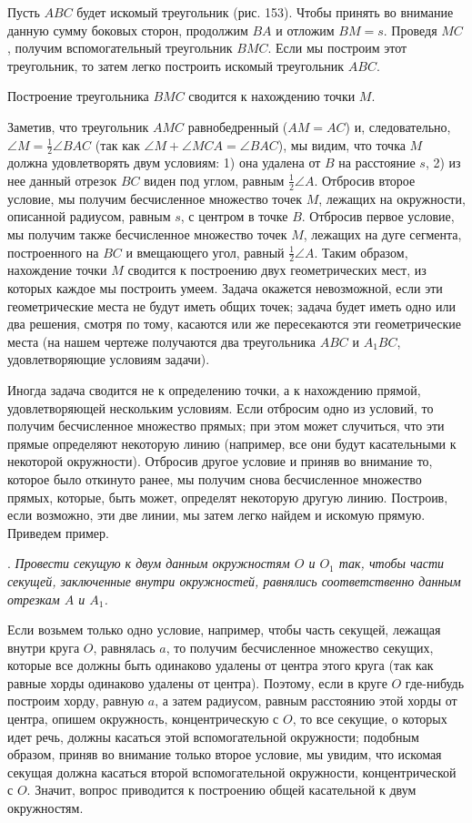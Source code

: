 \documentclass[oneside]{book}
\begin{document}
Пусть $ABC$ будет искомый треугольник (рис. 153).
Чтобы принять во внимание данную сумму боковых сторон, продолжим $BA$ и отложим $BM=s$.
Проведя $MC$, получим вспомогательный треугольник $BMC$.
Если мы построим этот треугольник, то затем легко построить искомый треугольник $ABC$.

Построение треугольника $BMC$ сводится к нахождению точки $M$.

Заметив, что треугольник $AMC$ равнобедренный ($AM=AC$) и, следовательно, $\angle M =  \tfrac12\angle BAC$ (так как $\angle M+\angle MCA = \angle BAC$), мы видим, что точка $M$ должна удовлетворять двум условиям:
1) она удалена от $B$ на расстояние $s$, 
2) из нее данный отрезок $BC$ виден под углом, равным $\tfrac12\angle A$.
Отбросив второе условие, мы получим бесчисленное множество точек $M$, лежащих на окружности, описанной радиусом, равным $s$, с центром в точке $B$.
Отбросив первое условие, мы получим также бесчисленное множество точек $M$, лежащих на дуге сегмента, построенного на $BC$ и вмещающего угол, равный $\tfrac12\angle A$.
Таким образом, нахождение точки $M$ сводится к построению двух геометрических мест, из которых каждое мы построить умеем.
Задача окажется невозможной, если эти геометрические места не будут иметь общих точек;
задача будет иметь одно или два решения, смотря по тому, касаются или же пересекаются эти геометрические места (на нашем чертеже получаются два треугольника $ABC$ и $A_1BC$, удовлетворяющие условиям задачи).

Иногда задача сводится не к определению точки, а к нахождению прямой, удовлетворяющей нескольким условиям.
Если отбросим одно из условий, то получим бесчисленное множество прямых;
при этом может случиться, что эти прямые определяют некоторую линию (например, все они будут касательными к некоторой окружности).
Отбросив другое условие и приняв во внимание то, которое было откинуто ранее, мы получим снова бесчисленное множество прямых, которые, быть может, определят некоторую другую линию.
Построив, если возможно, эти две линии, мы затем легко найдем и искомую прямую.
Приведем пример.

.
\emph{Провести секущую к двум данным окружностям $O$ и $O_1$ так, чтобы части секущей, заключенные внутри окружностей, равнялись соответственно данным отрезкам $A$ и $A_1$.}

Если возьмем только одно условие, например, чтобы часть секущей, лежащая внутри круга $O$, равнялась $a$, то получим бесчисленное множество секущих, которые все должны быть одинаково удалены от центра этого круга (так как равные хорды одинаково удалены от центра).
Поэтому, если в круге $O$ где-нибудь построим хорду, равную $a$, а затем радиусом, равным расстоянию этой хорды от центра, опишем окружность, концентрическую с $O$, то все секущие, о которых идет речь, должны касаться этой вспомогательной окружности;
подобным образом, приняв во внимание только второе условие, мы увидим, что искомая секущая должна касаться второй вспомогательной окружности, концентрической с $O$.
Значит, вопрос приводится к построению общей касательной к двум окружностям.
\end{document}
